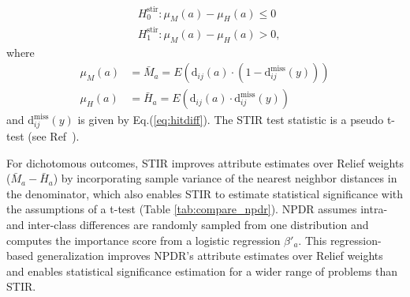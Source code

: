 \documentclass{bioinfo}
\begin{document}

\begin{equation}
\begin{aligned}
    & H^{\text{stir}}_0: \mu_M(a) - \mu_H(a) \le 0 \\
    & H^{\text{stir}}_1: \mu_M(a) - \mu_H(a) > 0,
\end{aligned}
\end{equation}  
where
\begin{equation}
\begin{aligned}
    \mu_M(a) & = \bar{M}_a = E \left( \text{d}_{ij}(a) \cdot \left( 1-\text{d}^{\text{miss}}_{ij}(y) \right) \right) \\
    \mu_H(a) & = \bar{H}_a = E \left( \text{d}_{ij}(a) \cdot        \text{d}^{\text{miss}}_{ij}(y)           \right)
\end{aligned}
\end{equation}  
and $\text{d}^{\text{miss}}_{ij}(y)$ is given by Eq.(\ref{eq:hitdiff}). The STIR test statistic is a pseudo t-test (see Ref~\citep{stir}).

For dichotomous outcomes, STIR improves attribute estimates over Relief weights ($\bar{M}_a - \bar{H}_a$) by incorporating sample variance of the nearest neighbor distances in the denominator, which also enables STIR to estimate statistical significance with the assumptions of a t-test (Table \ref{tab:compare_npdr}).
NPDR assumes intra- and inter-class differences are randomly sampled from one distribution and computes the importance score from a logistic regression $\beta'_a$.
This regression-based generalization improves NPDR's attribute estimates over Relief weights and enables statistical significance estimation for a wider range of problems than STIR.
\end{document}
